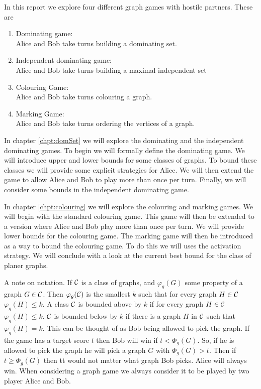 In this report %
we explore four different graph games with hostile partners. These are
\begin{enumerate}
    \item Dominating game: \\
        Alice and Bob take turns building a dominating set.
    \item Independent dominating game: \\
        Alice and Bob take turns building a maximal independent set    
    \item Colouring Game: \\
        Alice and Bob take turns colouring a graph.
    \item Marking Game: \\
        Alice and Bob take turns ordering the vertices of a graph.
\end{enumerate}

In chapter \ref{chpt:domSet} we will explore the dominating and the independent dominating games. To begin we  will formally define the dominating game. We will introduce upper and lower bounds for some classes of graphs. To bound these classes we will provide some explicit strategies for Alice. We will then extend the game to allow Alice and Bob to play more than once per turn. Finally, we will consider some bounds in the independent dominating game.

In chapter \ref{chpt:colouring} we will explore the colouring and marking games. We will begin with the standard colouring game. This game will then be extended to a version where Alice and Bob play more than once per turn. We will provide lower bounds for the colouring game. The marking game will then be introduced as a way to bound the colouring game. To do this we will uses the activation strategy. We will conclude with a look at the current best bound for the class of planer graphs.




    
A note on notation. If $\mathcal{C}$ is a class of graphs, and $\varphi_g(G)$ some property of a graph $G \in \mathcal{C}$. Then $\varphi_g(\mathcal{C})$ is the smallest $k$ such that for every graph $H\in\mathcal{C}$ $\varphi_g(H)\leq k$. A class $\mathcal{C}$ is bounded above by $k$ if for every graph $H\in\mathcal{C}$ $\varphi_g(H)\leq k$. $\mathcal{C}$ is bounded below by $k$ if there is a graph $H$ in $\mathcal{C}$ such that $\varphi_g(H)= k$. This can be thought of as Bob being allowed to pick the graph. If the game has a target score $t$ then Bob will win if $t < \varPhi_g(G)$. So, if he is allowed to pick the graph he will pick a graph $G$ with $\varPhi_g(G) > t$. Then if $t\geq \varPhi_g(G)$ then tt would not matter what graph Bob picks. Alice will always win. When considering a graph game we always consider it to be played by two player Alice and Bob.  

